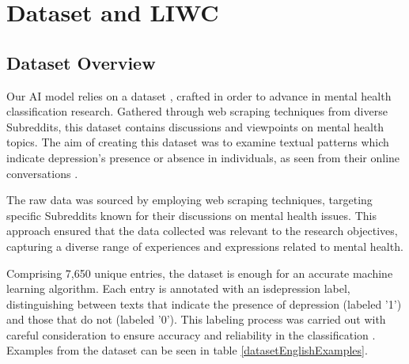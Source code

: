 \chapter{Dataset and LIWC}

\label{chap:ch3}

\par
\section{Dataset Overview}

\quad Our AI model relies on a dataset \cite{depressionDataset}, crafted in order to advance in mental health classification research. Gathered through web scraping techniques from diverse Subreddits, this dataset contains discussions and viewpoints on mental health topics. The aim of creating this dataset was to examine textual patterns which indicate depression's presence or absence in individuals, as seen from their online conversations .

The raw data was sourced by employing web scraping techniques, targeting specific Subreddits known for their discussions on mental health issues. This approach ensured that the data collected was relevant to the research objectives, capturing a diverse range of experiences and expressions related to mental health.

Comprising 7,650 unique entries, the dataset is enough for an accurate machine learning algorithm. Each entry is annotated with an is\textunderscore depression label, distinguishing between texts that indicate the presence of depression (labeled '1') and those that do not (labeled '0'). This labeling process was carried out with careful consideration to ensure accuracy and reliability in the classification \cite{depressionDataset}. Examples from the dataset can be seen in table \ref{datasetEnglishExamples}.

